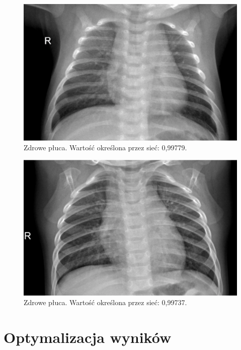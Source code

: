 \documentclass[12pt,a4paper,twoside,titlepage,openright]{book}
\begin{document}
\begin{itemize}
\begin{itemize}
\begin{figure}[ht]
	\centering
			\includegraphics[resolution=100, scale=0.3]{randomUncertain1.png}
		\caption{Zdrowe płuca. Wartość określona przez sieć: 0,99779.}
				\label{fig:randomUncertain1}
\end{figure}

\begin{figure}[ht]
	\centering
			\includegraphics[resolution=100, scale=0.3]{randomUncertain2.png}
		\caption{Zdrowe płuca. Wartość określona przez sieć: 0,99737.}
				\label{fig:randomUncertain2}
\end{figure}


\section{Optymalizacja wyników}

\end{itemize}
\end{itemize}
\end{document}
